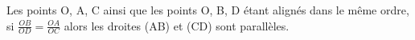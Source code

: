 
Les points O, A, C ainsi que les points O, B, D étant  alignés dans
le même ordre,\\
si $\frac{OB}{OD}=\frac{OA}{OC}$
alors les droites (AB) et (CD) sont parallèles.

